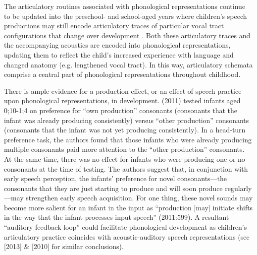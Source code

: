 \documentclass[a4paper,man,natbib,donotrepeattitle, apacite]{apa6}
\begin{document}
The articulatory routines associated with phonological representations continue to be updated into the preschool- and school-aged years where children's speech productions may still encode articulatory traces of particular vocal tract configurations that change over development \cite{davisEmergenceDiscretePerceptualMotor2019,mcallisterbyunMotorInfluencesGrammar2016}. Both these articulatory traces and the accompanying acoustics are encoded into phonological representations, updating them to reflect the child's increased experience with language and changed anatomy (e.g. lengthened vocal tract). In this way, articulatory schemata comprise a central part of phonological representations throughout childhood. 

There is ample evidence for a production effect, or an effect of speech practice upon phonological representations, in development. \citeauthor{depaolisProductionPatternsInfluence2011} (2011) tested infants aged 0;10-1;4 on preference for ``own production'' consonants (consonants that the infant was already producing consistently) versus ``other production'' consonants (consonants that the infant was not yet producing consistently). In a head-turn preference task, the authors found that those infants who were already producing multiple consonants paid more attention to the ``other production'' consonants. At the same time, there was no effect for infants who were producing one or no consonants at the time of testing. The authors suggest that, in conjunction with early speech perception, the infants’ preference for novel consonants---the consonants that they are just starting to produce and will soon produce regularly---may strengthen early speech acquisition. For one thing, these novel sounds may become more salient for an infant in the input as ``production [may] initiate shifts in the way that the infant processes input speech'' (2011:599). A resultant ``auditory feedback loop'' \cite{majoranoRelationshipInfantsProduction2014} could facilitate phonological development as children’s articulatory practice coincides with acoustic-auditory speech representations (see \citeauthor{depaolisInfluenceBabblingPatterns2013} [2013] \& \citeauthor{keren-portnoyRoleVocalPractice2010} [2010] for similar conclusions). 
\end{document}
